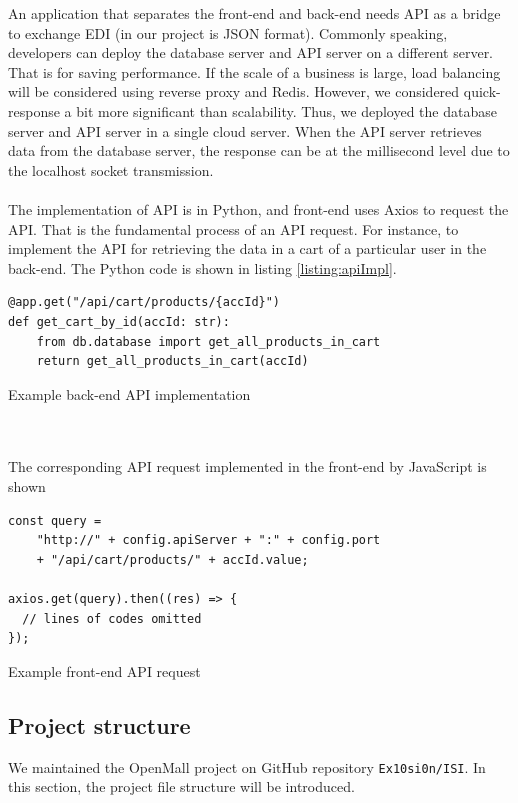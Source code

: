 \documentclass{article}
\begin{document}
An application that separates the front-end and back-end needs API as a bridge to exchange EDI (in our project is JSON format). Commonly speaking, developers can deploy the database server and API server on a different server. That is for saving performance. If the scale of a business is large, load balancing will be considered using reverse proxy and Redis. However, we considered quick-response a bit more significant than scalability. Thus, we deployed the database server and API server in a single cloud server. When the API server retrieves data from the database server, the response can be at the millisecond level due to the localhost socket transmission.
\\\\
The implementation of API is in Python, and front-end uses Axios to request the API. That is the fundamental process of an API request. For instance, to implement the API for retrieving the data in a cart of a particular user in the back-end. The Python code is shown in listing \ref{listing:apiImpl}.
\begin{listing}[!htp]
\begin{verbatim}
@app.get("/api/cart/products/{accId}")
def get_cart_by_id(accId: str):
    from db.database import get_all_products_in_cart
    return get_all_products_in_cart(accId)
\end{verbatim}
\caption{Example back-end API implementation}
\label{listing:apiImpl}
\end{listing}

\leavevmode
\\\\
The corresponding API request implemented in the front-end by JavaScript is shown

\begin{listing}[!htp]
\begin{verbatim}
const query =
    "http://" + config.apiServer + ":" + config.port
    + "/api/cart/products/" + accId.value;
    
axios.get(query).then((res) => {
  // lines of codes omitted
});
\end{verbatim}
\caption{Example front-end API request}
\end{listing}

\subsection{Project structure}

We maintained the OpenMall project on GitHub repository \verb|Ex10si0n/ISI|. In this section, the project file structure will be introduced. 
\end{document}
